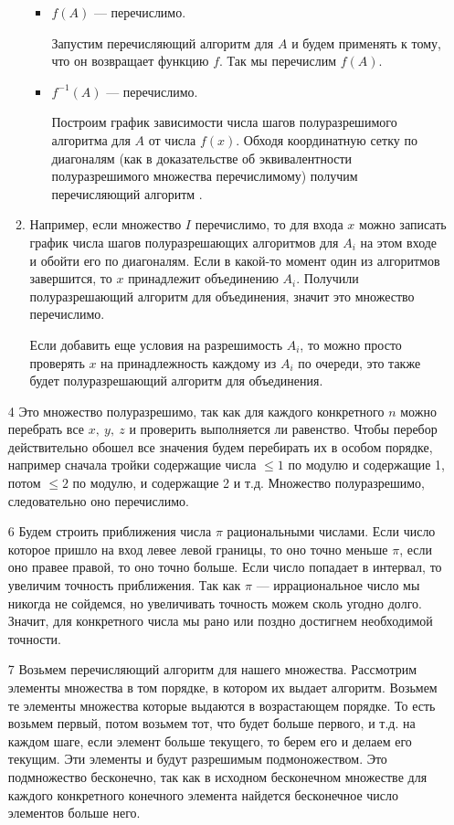 \documentclass[10pt]{article}
\begin{document}
\begin{enumerate}
\begin{enumerate}
\begin{itemize}
	\item $f(A)$ --- перечислимо.
	
	Запустим перечисляющий алгоритм для $A$ и будем применять к тому, что он возвращает функцию $f$. Так мы перечислим $f(A)$.
	
	\item $f^{-1}(A)$ --- перечислимо.
	
	Построим график зависимости числа шагов полуразрешимого алгоритма для $A$ от числа $f(x)$. Обходя координатную сетку по диагоналям (как в доказательстве об эквивалентности полуразрешимого множества перечислимому) получим перечисляющий алгоритм	.	
	\end{itemize}
	
	\item Например, если множество $I$ перечислимо, то для входа $x$ можно записать график числа шагов полуразрешающих алгоритмов для $A_i$ на этом входе и обойти его по диагоналям. Если в какой-то момент один из алгоритмов завершится, то $x$ принадлежит объединению $A_i$. Получили полуразрешающий алгоритм для объединения, значит это множество перечислимо.
	
	Если добавить еще условия на разрешимость $A_i$, то можно просто проверять $x$ на принадлежность каждому из $A_i$ по очереди, это также будет полуразрешающий алгоритм для объединения.
	\end{enumerate}
	
	\item[4] Это множество полуразрешимо, так как для каждого конкретного $n$ можно перебрать все $x,\ y,\ z$ и проверить выполняется ли равенство. Чтобы перебор действительно обошел все значения будем перебирать их в особом порядке, например сначала тройки содержащие числа $\leq 1$ по модулю и содержащие 1, потом $\leq 2$ по модулю, и содержащие 2 и т.д. Множество полуразрешимо, следовательно оно перечислимо.
	
	\item[6] Будем строить приближения числа $\pi$ рациональными числами. Если число которое пришло на вход левее левой границы, то оно точно меньше $\pi$, если оно правее правой, то оно точно больше. Если число попадает в интервал, то увеличим точность приближения. Так как $\pi$ --- иррациональное число мы никогда не сойдемся, но увеличивать точность можем сколь угодно долго. Значит, для конкретного числа мы рано или поздно достигнем необходимой точности.
	
	\item[7] Возьмем перечисляющий алгоритм для нашего множества. Рассмотрим элементы множества в том порядке, в котором их выдает алгоритм. Возьмем те элементы множества которые выдаются в возрастающем порядке. То есть возьмем первый, потом возьмем тот, что будет больше первого, и т.д. на каждом шаге, если элемент больше текущего, то берем его и делаем его текущим. Эти элементы и будут разрешимым подмоножеством. Это подмножество бесконечно, так как в исходном бесконечном множестве для каждого конкретного конечного элемента найдется бесконечное число элементов больше него.
	

\end{enumerate}
\end{document}
